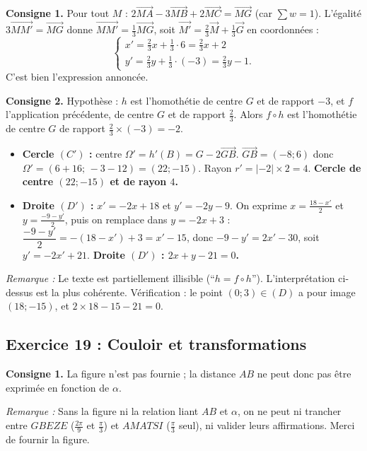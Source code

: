 \documentclass[11pt,a4paper]{article}
\newcommand{\vect}[1]{\overrightarrow{#1}}
\newenvironment{rem}{\par\medskip\noindent\textit{Remarque :}\quad}{\par\medskip}
\begin{document}
\textbf{Consigne 1.} Pour tout $M$ : $2\vect{MA}-3\vect{MB}+2\vect{MC}=\vect{MG}$ (car $\sum w=1$).
L'\'egalit\'e $3\vect{MM'}=\vect{MG}$ donne $\vect{MM'}=\frac13\vect{MG}$, soit
$\vect{M'}=\frac23\vect{M}+\frac13\vect{G}$ en coordonn\'ees :
\[
\begin{cases}
x'=\frac23x+\frac13\cdot6=\frac23x+2\\[2pt]
y'=\frac23y+\frac13\cdot(-3)=\frac23y-1.
\end{cases}
\]
C'est bien l'expression annonc\'ee.

\textbf{Consigne 2.} Hypoth\`ese : $h$ est l'homoth\'etie de centre $G$ et de rapport $-3$, et $f$ l'application pr\'ec\'edente,
de centre $G$ et de rapport $\frac23$. Alors $f\circ h$ est l'homoth\'etie de centre $G$ de rapport $\frac23\times(-3)=-2$.
\begin{itemize}
  \item \textbf{Cercle $(C')$ :} centre $\Omega'=h'(B)=G-2\vect{GB}$. $\vect{GB}=(-8;6)$ donc $\Omega'=(6+16;\,-3-12)=(22;-15)$.
  Rayon $r'=|-2|\times2=4$. \textbf{Cercle de centre $(22;-15)$ et de rayon $4$.}
  \item \textbf{Droite $(D')$ :} $x'=-2x+18$ et $y'=-2y-9$. On exprime $x=\frac{18-x'}{2}$ et $y=\frac{-9-y'}{2}$,
  puis on remplace dans $y=-2x+3$ :
  $\dfrac{-9-y'}{2}=-(18-x')+3=x'-15$, donc $-9-y'=2x'-30$, soit $y'=-2x'+21$.
  \textbf{Droite $(D')$ : $2x+y-21=0$.}
\end{itemize}
\begin{rem} Le texte est partiellement illisible (``$h=f\circ h$''). L'interpr\'etation ci-dessus est la plus coh\'erente.
V\'erification : le point $(0;3)\in(D)$ a pour image $(18;-15)$, et $2\times18-15-21=0$.\end{rem}

\subsection{Exercice 19 : Couloir et transformations}

\textbf{Consigne 1.} La figure n'est pas fournie ; la distance $AB$ ne peut donc pas \^etre exprim\'ee en fonction de $\alpha$.
\begin{rem} Sans la figure ni la relation liant $AB$ et $\alpha$, on ne peut ni trancher entre $GBEZE$ ($\frac{2\pi}{9}$ et $\frac{\pi}{3}$) et
$AMATSI$ ($\frac{\pi}{3}$ seul), ni valider leurs affirmations. Merci de fournir la figure.\end{rem}
\end{document}
